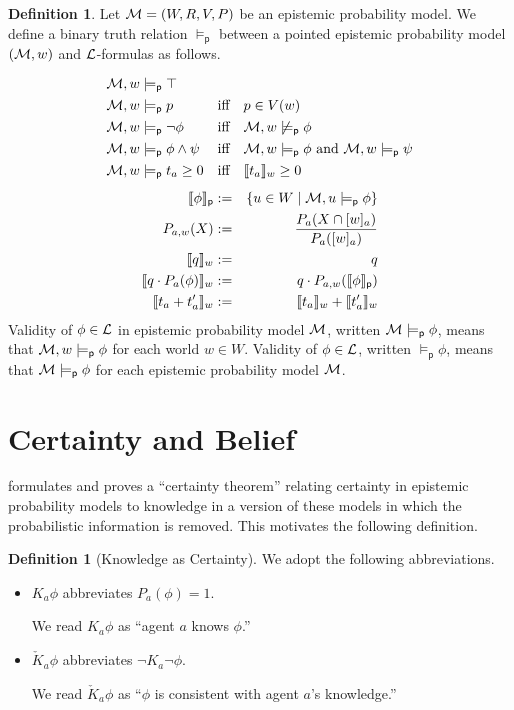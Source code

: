 \documentclass[12pt]{article}
\theoremstyle{definition}
\newtheorem{definition}[theorem]{Definition}
\newcommand{\M}{{\cal M}}      %
\newcommand{\Lang}{{\cal L}}   %
\newcommand{\sem}[1]{\llbracket{#1}\rrbracket}               %
\newcommand{\modelsp}{\models_{\mathsf{p}}}                  %
\newcommand{\semp}[1]{\llbracket{#1}\rrbracket_{\mathsf{p}}} %
\begin{document}
\begin{definition} 
  Let $\M=(W,R,V,P)$ be an epistemic probability model.  We define
  a binary truth relation $\modelsp$ between a pointed epistemic
  probability model $(\M,w)$ and $\Lang$-formulas as follows.
  \[
  \renewcommand{\arraystretch}{1.3}
  \begin{array}{lcl}
    \M,w\modelsp\top 
    \\
    \M,w\modelsp p & \text{iff} & 
    p \in V(w) 
    \\
    \M,w\modelsp\neg\phi & \text{iff} &
    \M,w\not\modelsp\phi
    \\
    \M,w\modelsp\phi\land\psi & \text{iff} &
    \M,w\modelsp\phi \text{ and } \M,w\modelsp\psi
    \\
    \M,w\modelsp t_a\geq 0 & \text{iff} &
    \sem{t_a}_w\geq 0
  \end{array}
  \]
  \begin{eqnarray*}
    \semp{\phi} & := &
    \{ u \in W\mid \M,u\modelsp\phi \}
    \\
    P_{a,w}(X) & := & 
    \displaystyle\frac{P_a(X\cap[w]_a)}{P_a([w]_a)}
    \\
    \sem{q}_w & := & q
    \\
    \sem{q\cdot P_a(\phi)}_w & := & 
    q\cdot P_{a,w}(\semp{\phi}) 
    \\
    \sem{t_a+t_a'}_w & := &
    \sem{t_a}_w + \sem{t_a'}_w
  \end{eqnarray*}
  Validity of $\phi\in\Lang$ in epistemic probability model $\M$,
  written $\M\modelsp\phi$, means that $\M,w\modelsp\phi$ for each
  world $w\in W$.  Validity of $\phi\in\Lang$, written $\modelsp\phi$,
  means that $\M\modelsp\phi$ for each epistemic probability model
  $\M$.
\end{definition} 

\section{Certainty and Belief} 
\label{Section:CB} 

\cite{Eijck2013:lap} formulates and proves a ``certainty theorem''
relating certainty in epistemic probability models to knowledge in a
version of these models in which the probabilistic information is
removed.  This motivates the following definition.

\begin{definition}[Knowledge as Certainty]
  We adopt the following abbreviations.
  \begin{itemize}
  \item $K_a\phi$ abbreviates $P_a(\phi)=1$. 

    We read $K_a\phi$ as ``agent $a$ knows $\phi$.''

  \item $\check K_a\phi$ abbreviates $\lnot K_a\lnot\phi$.

    We read $\check K_a\phi$ as ``$\phi$ is consistent with agent
    $a$'s knowledge.''
  \end{itemize}
\end{definition}
\end{document}
